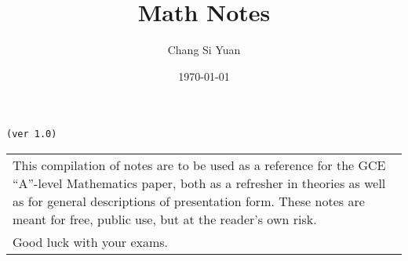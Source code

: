 \documentclass[../main]{subfiles}
\begin{document}
\author{Chang Si Yuan}
\title{Math Notes}
\date{\today}

\maketitle

\begin{center}

	\texttt{(ver 1.0)}

	\vspace{50pt}

	\begin{tabular}{>{\flushleft}p{8cm}}
	This compilation of notes are to be used as a reference for the GCE ``A''-level Mathematics paper, both as a refresher in theories as well as for general descriptions of presentation form. These notes are meant for free, public use, but at the reader's own risk. \\
	Good luck with your exams.
	\end{tabular}

	\vspace{50pt}

\end{center}

\newpage
\end{document}
